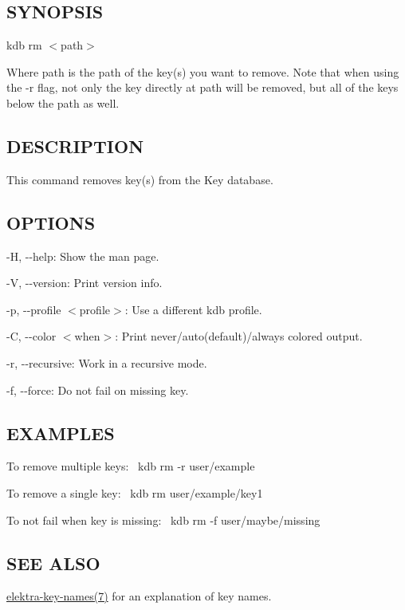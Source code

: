 \subsection*{S\+Y\+N\+O\+P\+S\+IS}

{\ttfamily kdb rm $<$path$>$}

Where {\ttfamily path} is the path of the key(s) you want to remove. Note that when using the {\ttfamily -\/r} flag, not only the key directly at {\ttfamily path} will be removed, but all of the keys below the path as well.

\subsection*{D\+E\+S\+C\+R\+I\+P\+T\+I\+ON}

This command removes key(s) from the Key database.

\subsection*{O\+P\+T\+I\+O\+NS}


\begin{DoxyItemize}
\item {\ttfamily -\/H}, {\ttfamily -\/-\/help}\+: Show the man page.
\item {\ttfamily -\/V}, {\ttfamily -\/-\/version}\+: Print version info.
\item {\ttfamily -\/p}, {\ttfamily -\/-\/profile $<$profile$>$}\+: Use a different kdb profile.
\item {\ttfamily -\/C}, {\ttfamily -\/-\/color $<$when$>$}\+: Print never/auto(default)/always colored output.
\item {\ttfamily -\/r}, {\ttfamily -\/-\/recursive}\+: Work in a recursive mode.
\item {\ttfamily -\/f}, {\ttfamily -\/-\/force}\+: Do not fail on missing key.
\end{DoxyItemize}

\subsection*{E\+X\+A\+M\+P\+L\+ES}

To remove multiple keys\+:~\newline
 {\ttfamily kdb rm -\/r user/example}

To remove a single key\+:~\newline
 {\ttfamily kdb rm user/example/key1}

To not fail when key is missing\+:~\newline
 {\ttfamily kdb rm -\/f user/maybe/missing}

\subsection*{S\+EE A\+L\+SO}


\begin{DoxyItemize}
\item \hyperlink{doc_help_elektra-key-names_md}{elektra-\/key-\/names(7)} for an explanation of key names. 
\end{DoxyItemize}